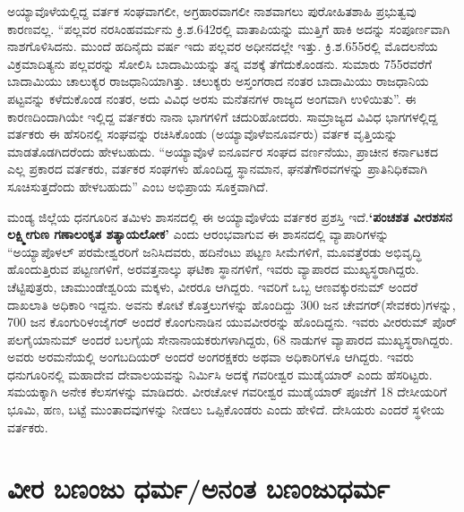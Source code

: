 ಅಯ್ಯಾವೊಳೆಯಲ್ಲಿದ್ದ ವರ್ತಕ ಸಂಘವಾಗಲೀ, ಅಗ್ರಹಾರವಾಗಲೀ ನಾಶವಾಗಲು ಪುರೋಹಿತಶಾಹಿ ಪ್ರಭುತ್ವವು ಕಾರಣವಲ್ಲ. “ಪಲ್ಲವರ ನರಸಿಂಹವರ್ಮನು ಕ್ರಿ.ಶ.642ರಲ್ಲಿ ವಾತಾಪಿಯನ್ನು ಮುತ್ತಿಗೆ ಹಾಕಿ ಅದನ್ನು ಸಂಪೂರ್ಣವಾಗಿ ನಾಶಗೊಳಿಸಿದನು. ಮುಂದೆ ಹದಿನೈದು ವರ್ಷ ಇದು ಪಲ್ಲವರ ಅಧೀನದಲ್ಲೇ ಇತ್ತು. ಕ್ರಿ.ಶ.655ರಲ್ಲಿ ಮೊದಲನೆಯ ವಿಕ್ರಮಾದಿತ್ಯನು ಪಲ್ಲವರನ್ನು ಸೋಲಿಸಿ ಬಾದಾಮಿಯನ್ನು ತನ್ನ ವಶಕ್ಕೆ ತೆಗೆದುಕೊಂಡನು. ಸುಮಾರು 755ರವರೆಗೆ ಬಾದಾಮಿಯು ಚಾಲುಕ್ಯರ ರಾಜಧಾನಿಯಾಗಿತ್ತು. ಚಲುಕ್ಯರು ಅಸ್ತಂಗರಾದ ನಂತರ ಬಾದಾಮಿಯು ರಾಜಧಾನಿಯ ಪಟ್ಟವನ್ನು ಕಳೆದುಕೊಂಡ ನಂತರ, ಅದು ವಿವಿಧ ಅರಸು ಮನೆತನಗಳ ರಾಜ್ಯದ ಅಂಗವಾಗಿ ಉಳಿಯಿತು”. ಈ ಕಾರಣದಿಂದಾಗಿಯೇ ಇಲ್ಲಿದ್ದ ವರ್ತಕರು ನಾನಾ ಭಾಗಗಳಿಗೆ ಚದುರಿಹೋದರು. ಸಾಮ್ರಾಜ್ಯದ ವಿವಿಧ ಭಾಗಗಳಲ್ಲಿದ್ದ ವರ್ತಕರು ಈ ಹೆಸರಿನಲ್ಲಿ ಸಂಘವನ್ನು ರಚಿಸಿಕೊಂಡು (ಅಯ್ಯಾವೊಳೆಐನೂರ್ವರು) ವರ್ತಕ ವೃತ್ತಿಯನ್ನು ಮಾಡತೊಡಗಿದರೆಂದು ಹೇಳಬಹುದು. “ಅಯ್ಯಾವೊಳೆ ಐನೂರ್ವರ ಸಂಘದ ವರ್ಣನೆಯು, ಪ್ರಾಚೀನ ಕರ್ನಾಟಕದ ಎಲ್ಲ ಪ್ರಕಾರದ ವರ್ತಕರು, ವರ್ತಕರ ಸಂಘಗಳು ಹೊಂದಿದ್ದ ಸ್ಥಾನಮಾನ, ಘನತೆಗೌರವಗಳನ್ನು ಪ್ರಾತಿನಿಧಿಕವಾಗಿ ಸೂಚಿಸುತ್ತದೆಂದು ಹೇಳಬಹುದು” ಎಂಬ ಅಭಿಪ್ರಾಯ ಸೂಕ್ತವಾಗಿದೆ.

ಮಂಡ್ಯ ಜಿಲ್ಲೆಯ ಧನಗೂರಿನ ತಮಿಳು ಶಾಸನದಲ್ಲಿ ಈ ಅಯ್ಯಾವೊಳೆಯ ವರ್ತಕರ ಪ್ರಶಸ್ತಿ ಇದೆ.\break \textbf{‘ಪಂಚಶತ ವೀರಶಸನ ಲಕ್ಷ್ಮೀಗುಣ ಗಣಾಲಂಕೃತ ಶತ್ಯಾಯಲೋಕ’} ಎಂದು ಆರಂಭವಾಗುವ ಈ ಶಾಸನದಲ್ಲಿ ವ್ಯಾಪಾರಿಗಳನ್ನು “ಅಯ್ಯಾಪೊಳಲ್​ ಪರಮೇಶ್ವರರಿಗೆ ಜನಿಸಿದವರು, ಹದಿನೆಂಟು ಪಟ್ಟಣ ಸೀಮೆಗಳಿಗೆ, ಮೂವತ್ತೆರಡು ಅಭಿವೃದ್ಧಿ ಹೊಂದುತ್ತಿರುವ ಪಟ್ಟಣಗಳಿಗೆ, ಅರವತ್ತನಾಲ್ಕು ಘಟಿಕಾ ಸ್ಥಾನಗಳಿಗೆ, ಇವರು ವ್ಯಾಪಾರದ ಮುಖ್ಯಸ್ಥರಾಗಿದ್ದರು. ಚೆಟ್ಟಿಪುತ್ರರು, ಚಾಮುಂಡೇಶ್ವರಿಯ ಮಕ್ಕಳು, ವೀರರೂ ಆಗಿದ್ದರು. ಇವರಿಗೆ ಒಬ್ಬ ಆಣವಕ್ಕುರನುಮ್ ಅಂದರೆ ದಾಖಲಾತಿ ಅಧಿಕಾರಿ ಇದ್ದನು. ಅವನು ಕೋಟೆ ಕೊತ್ತಲುಗಳನ್ನು ಹೊಂದಿದ್ದು 300 ಜನ ಚೇವಗರ್​(ಸೇವಕರು)ಗಳನ್ನು, 700 ಜನ ಕೊಂಗುರಿಳಂಜೈಗರ್​ ಅಂದರೆ ಕೊಂಗುನಾಡಿನ ಯುವವೀರರನ್ನು ಹೊಂದಿದ್ದನು. ಇವರು ವೀರರುಮ್ ಪೊರ್​ಪಲಗೈಯಾನುಮ್ ಅಂದರೆ ಬಲಗೈಯ ಸೇನಾನಾಯಕರುಗಳಾಗಿದ್ದರು, 68 ನಾಡುಗಳ ವ್ಯಾಪಾರದ ಮುಖ್ಯಸ್ಥರಾಗಿದ್ದರು. ಅವರು ಅರಮನೆಯಲ್ಲಿ ಅಂಗಬದಿಯರ್​ ಅಂದರೆ ಅಂಗರಕ್ಷಕರು ಅಥವಾ ಅಧಿಕಾರಿಗಳೂ ಆಗಿದ್ದರು. ಇವರು ಧನುಗೂರಿನಲ್ಲಿ ಮಹಾದೇವ ದೇವಾಲಯವನ್ನು ನಿರ್ಮಿಸಿ ಅದಕ್ಕೆ ಗವರೀಶ್ವರ ಮುಡೈಯಾರ್​ ಎಂದು ಹೆಸರಿಟ್ಟರು. ಸಮಯಕ್ಕಾಗಿ ಅನೇಕ ಕೆಲಸಗಳನ್ನು ಮಾಡಿದರು. ವೀರಚೋಳ ಗವರೀಶ್ವರ ಮುಡೈಯಾರ್​ ಪೂಜೆಗೆ 18 ದೇಸೀಯರಿಗೆ ಭೂಮಿ, ಹಣ, ಬಟ್ಟೆ ಮುಂತಾದವುಗಳನ್ನು ನೀಡಲು ಒಪ್ಪಿಕೊಂಡರು ಎಂದು ಹೇಳಿದೆ. ದೇಸಿಯರು ಎಂದರೆ ಸ್ಥಳೀಯ ವರ್ತಕರು.

\section{ವೀರ ಬಣಂಜು ಧರ್ಮ/ಅನಂತ ಬಣಂಜುಧರ್ಮ}

